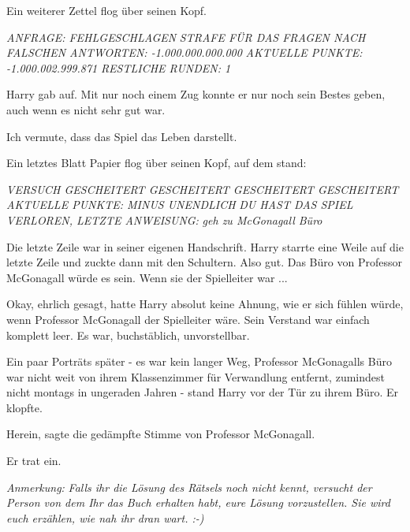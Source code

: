 Ein weiterer Zettel flog über seinen Kopf.

\emph{ANFRAGE: FEHLGESCHLAGEN} \emph{STRAFE FÜR DAS FRAGEN NACH FALSCHEN
ANTWORTEN: -1.000.000.000.000} \emph{AKTUELLE PUNKTE: -1.000.002.999.871}
\emph{RESTLICHE RUNDEN: 1}

Harry gab auf. Mit nur noch einem Zug konnte er nur noch sein Bestes geben, auch
wenn es nicht sehr gut war.

\glqq{}Ich vermute, dass das Spiel das Leben darstellt.\grqq{}

Ein letztes Blatt Papier flog über seinen Kopf, auf dem stand:

\emph{VERSUCH GESCHEITERT GESCHEITERT GESCHEITERT GESCHEITERT AKTUELLE PUNKTE:
MINUS UNENDLICH} \emph{DU HAST DAS SPIEL VERLOREN, LETZTE ANWEISUNG:}
\emph{geh zu McGonagall Büro}

Die letzte Zeile war in seiner eigenen Handschrift. Harry starrte eine Weile auf
die letzte Zeile und zuckte dann mit den Schultern. Also gut. Das Büro von
Professor McGonagall würde es sein. Wenn sie der Spielleiter war ...

Okay, ehrlich gesagt, hatte Harry absolut keine Ahnung, wie er sich fühlen
würde, wenn Professor McGonagall der Spielleiter wäre. Sein Verstand war einfach
komplett leer. Es war, buchstäblich, unvorstellbar.

Ein paar Porträts später - es war kein langer Weg, Professor McGonagalls Büro
war nicht weit von ihrem Klassenzimmer für Verwandlung entfernt, zumindest nicht
montags in ungeraden Jahren - stand Harry vor der Tür zu ihrem Büro. Er klopfte.

\glqq{}Herein\grqq{}, sagte die gedämpfte Stimme von Professor McGonagall.

Er trat ein.

\emph{Anmerkung:} \emph{Falls ihr die Lösung des Rätsels noch nicht kennt,
versucht der Person von dem Ihr das Buch erhalten habt, eure Lösung
vorzustellen. Sie wird euch erzählen, wie nah ihr dran wart. :-)}
